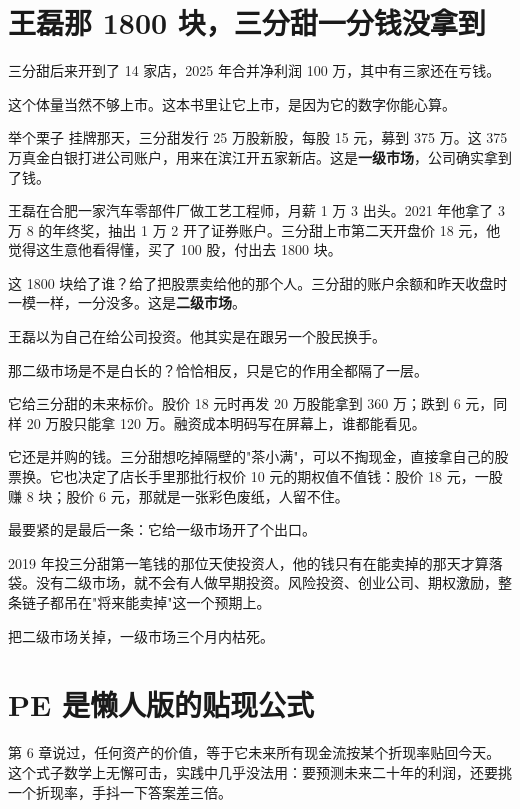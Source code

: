 \section{王磊那 1800 块，三分甜一分钱没拿到}

三分甜后来开到了 14 家店，2025 年合并净利润 100 万，其中有三家还在亏钱。

这个体量当然不够上市。这本书里让它上市，是因为它的数字你能心算。

\begin{egbox}{举个栗子}
挂牌那天，三分甜发行 25 万股新股，每股 15 元，募到 375 万。这 375 万真金白银打进公司账户，用来在滨江开五家新店。这是\textbf{一级市场}，公司确实拿到了钱。

王磊在合肥一家汽车零部件厂做工艺工程师，月薪 1 万 3 出头。2021 年他拿了 3 万 8 的年终奖，抽出 1 万 2 开了证券账户。三分甜上市第二天开盘价 18 元，他觉得这生意他看得懂，买了 100 股，付出去 1800 块。

这 1800 块给了谁？给了把股票卖给他的那个人。三分甜的账户余额和昨天收盘时一模一样，一分没多。这是\textbf{二级市场}。

\end{egbox}

王磊以为自己在给公司投资。他其实是在跟另一个股民换手。

那二级市场是不是白长的？恰恰相反，只是它的作用全都隔了一层。

它给三分甜的未来标价。股价 18 元时再发 20 万股能拿到 360 万；跌到 6 元，同样 20 万股只能拿 120 万。融资成本明码写在屏幕上，谁都能看见。

它还是并购的钱。三分甜想吃掉隔壁的"茶小满"，可以不掏现金，直接拿自己的股票换。它也决定了店长手里那批行权价 10 元的期权值不值钱：股价 18 元，一股赚 8 块；股价 6 元，那就是一张彩色废纸，人留不住。

最要紧的是最后一条：它给一级市场开了个出口。

2019 年投三分甜第一笔钱的那位天使投资人，他的钱只有在能卖掉的那天才算落袋。没有二级市场，就不会有人做早期投资。风险投资、创业公司、期权激励，整条链子都吊在"将来能卖掉"这一个预期上。

把二级市场关掉，一级市场三个月内枯死。

\section{PE 是懒人版的贴现公式}

第 6 章说过，任何资产的价值，等于它未来所有现金流按某个折现率贴回今天。这个式子数学上无懈可击，实践中几乎没法用：要预测未来二十年的利润，还要挑一个折现率，手抖一下答案差三倍。

